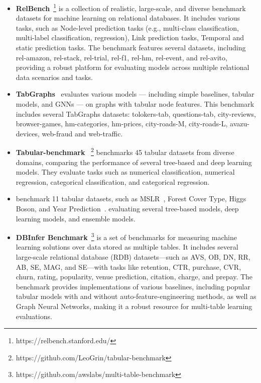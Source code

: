 \begin{itemize}[leftmargin=*]
    \item \textbf{RelBench}~\citep{robinson2024relbench, fey2023relational}\footnote{https://relbench.stanford.edu/} is a collection of realistic, large-scale, and diverse benchmark datasets for machine learning on relational databases. It includes various tasks, such as Node-level prediction tasks (e.g., multi-class classification, multi-label classification, regression), Link prediction tasks, Temporal and static prediction tasks. The benchmark features several datasets, including rel-amazon, rel-stack, rel-trial, rel-f1, rel-hm, rel-event, and rel-avito, providing a robust platform for evaluating models across multiple relational data scenarios and tasks.
    
    \item \textbf{TabGraphs}~\citep{bazhenov2024tabgraphs} evaluates various models — including simple baselines, tabular models, and GNNs — on graphs with tabular node features. This benchmark includes several TabGraphs datasets: tolokers-tab, questions-tab, city-reviews, browser-games, hm-categories, hm-prices, city-roads-M, city-roads-L, avazu-devices, web-fraud and web-traffic. 
    \item \textbf{Tabular-benchmark}~\citep{grinsztajn2022tree} \footnote{https://github.com/LeoGrin/tabular-benchmark} benchmarks 45 tabular datasets from diverse domains, comparing the performance of several tree-based and deep learning models. They evaluate tasks such as numerical classification, numerical regression, categorical classification, and categorical regression. 
    \item \citet{shwartz2022tabular} benchmark 11 tabular datasets, such as 
    MSLR~\citep{qin2013introducing},  Forest Cover Type, Higgs Boson, and Year Prediction~\citep{dua2017uci}.
    evaluating several tree-based models, deep learning models, and ensemble models.
    \item \textbf{DBInfer Benchmark}~\citep{wang20244dbinfer}\footnote{https://github.com/awslabs/multi-table-benchmark}  is a set of benchmarks for measuring machine learning solutions over data stored as multiple tables. It includes several large-scale relational database (RDB) datasets—such as AVS, OB, DN, RR, AB, SE, MAG, and SE—with tasks like retention, CTR, purchase, CVR, churn, rating, popularity, venue prediction, citation, charge, and prepay. The benchmark provides implementations of various baselines, including popular tabular models with and without auto-feature-engineering methods, as well as Graph Neural Networks, making it a robust resource for multi-table learning evaluations.

\end{itemize}
